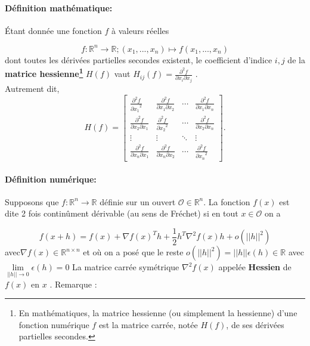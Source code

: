 \paragraph*{Définition mathématique:}
Étant donnée une fonction ${f}$ à valeurs réelles

$${ f:\mathbb{R}^{n}\to \mathbb {R} ;(x_{1},...,x_{n})\mapsto f(x_{1},...,x_{n})}$$
dont toutes les dérivées partielles secondes existent, le coefficient d'indice ${ i,j}$ de la \textbf{matrice hessienne\footnote{En mathématiques, la matrice hessienne (ou simplement la hessienne) d'une fonction numérique $f$ est la matrice carrée, notée $H(f)$, de ses dérivées partielles secondes.}} ${H(f)}$ vaut ${H_{ij}(f)={\frac {\partial ^{2}f}{\partial x_{i}\partial x_{j}}}}$ \cite{jtshiman:2021}.\\
Autrement dit,
$$
{ H(f)={
		\begin{bmatrix}{
			\frac {\partial ^{2}f}{{\partial x_{1}}^{2}}}&{\frac {\partial ^{2}f}{\partial x_{1}\partial x_{2}}}&\cdots &{\frac {\partial ^{2}f}{\partial x_{1}\partial x_{n}}}\\
		{\frac {\partial ^{2}f}{\partial x_{2}\partial x_{1}}}&{\frac {\partial ^{2}f}{{\partial x_{2}}^{2}}}&\cdots &{\frac {\partial ^{2}f}{\partial x_{2}\partial x_{n}}}\\
		\vdots &\vdots &\ddots &\vdots \\
		{\frac {\partial ^{2}f}{\partial x_{n}\partial x_{1}}}&{\frac {\partial ^{2}f}{\partial x_{n}\partial x_{2}}}&\cdots &{\frac {\partial ^{2}f}{{\partial x_{n}}^{2}}}
		\end{bmatrix}}} .
$$

\paragraph*{Définition numérique:}
Supposons que $f : \mathbb{R}^{n} \to \mathbb{R}$ définie sur un ouvert $\mathcal{O} \in \mathbb{R}^{n}$. La fonction $f(x)$ est dite 2
fois continûment dérivable (au sens de Fréchet) si en tout $x \in \mathcal{O}$ on a

\begin{equation}
f(x + h) = f(x)+\nabla f(x)^Th + \frac{1}{2}h^T\nabla^2f(x)h+o(||h||^2)
\end{equation}
avec$\nabla f(x)\in \mathbb{R}^{n\times n}$ et où on a posé que le reste 
$ o(||h||^2) =||h|| \epsilon(h) \in \mathbb{R} $ avec 
$\lim\limits_{||h|| \to 0} \epsilon(h) = 0 $
La matrice carrée symétrique $\nabla^2 f(x)$ appelée \textbf{Hessien} de $f(x)$ en $x$ \cite{bierlaire2006introduction}. Remarque :

